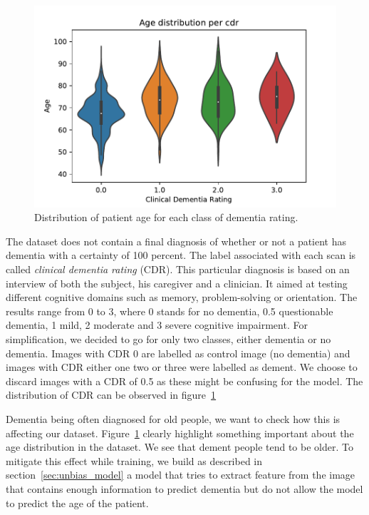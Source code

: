 \begin{figure}
 \centering
 \includegraphics[width=.9\linewidth]{figures/dataset/OASIS_age_dist_per_cdr.pdf}
 \captionsetup{width=.9\linewidth}
 \caption{Distribution of patient age for each class of dementia rating.}
 \label{fig:OASIS_age_dist}
\end{figure}

The dataset does not contain a final diagnosis of whether or not a patient has dementia with a certainty of 100 percent. The label associated with each scan is called \textit{clinical dementia rating} (CDR)\footnotemark. This particular diagnosis is based on an interview of both the subject, his caregiver and a clinician. It aimed at testing different cognitive domains such as memory, problem-solving or orientation. The results range from 0 to 3, where 0 stands for no dementia, 0.5 questionable dementia, 1 mild, 2 moderate and 3 severe cognitive impairment. For simplification, we decided to go for only two classes, either dementia or no dementia. Images with CDR 0 are labelled as control image (no dementia) and images with CDR either one two or three were labelled as dement. We choose to discard images with a CDR of 0.5 as these might be confusing for the model. The distribution of CDR can be observed in figure~\ref{fig:OASIS_age_dist}

Dementia being often diagnosed for old people, we want to check how this is affecting our dataset. Figure~\ref{fig:OASIS_age_dist} clearly highlight something important about the age distribution in the dataset. We see that dement people tend to be older. To mitigate this effect while training, we build as described in section~\ref{sec:unbias_model} a model that tries to extract feature from the image that contains enough information to predict dementia but do not allow the model to predict the age of the patient. 


